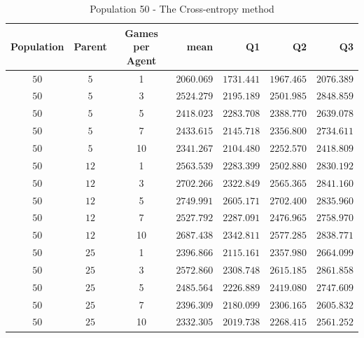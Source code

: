\begin{table}[H]
\centering
\small
\begin{tabular}{c c c r r r r}
Population & Parent & Games per Agent & mean & Q1 & Q2 & Q3\\
\hline
$50$ & $5$ & 1 & $2060.069$ & $1731.441$ & $1967.465$ & $2076.389$\\
\hdashline
$50$ & $5$ & 3 & $2524.279$ & $2195.189$ & $2501.985$ & $2848.859$\\
\hdashline
$50$ & $5$ & 5 & $2418.023$ & $2283.708$ & $2388.770$ & $2639.078$\\
$50$ & $5$ & 7 & $2433.615$ & $2145.718$ & $2356.800$ & $2734.611$\\
$50$ & $5$ & 10 & $2341.267$ & $2104.480$ & $2252.570$ & $2418.809$\\
$50$ & $12$ & 1 & $2563.539$ & $2283.399$ & $2502.880$ & $2830.192$\\
$50$ & $12$ & 3 & $2702.266$ & $2322.849$ & $2565.365$ & $2841.160$\\
\hdashline
$50$ & $12$ & 5 & $2749.991$ & $2605.171$ & $2702.400$ & $2835.960$\\
\hdashline
$50$ & $12$ & 7 & $2527.792$ & $2287.091$ & $2476.965$ & $2758.970$\\
$50$ & $12$ & 10 & $2687.438$ & $2342.811$ & $2577.285$ & $2838.771$\\
$50$ & $25$ & 1 & $2396.866$ & $2115.161$ & $2357.980$ & $2664.099$\\
\hdashline
$50$ & $25$ & 3 & $2572.860$ & $2308.748$ & $2615.185$ & $2861.858$\\
\hdashline
$50$ & $25$ & 5 & $2485.564$ & $2226.889$ & $2419.080$ & $2747.609$\\
$50$ & $25$ & 7 & $2396.309$ & $2180.099$ & $2306.165$ & $2605.832$\\
$50$ & $25$ & 10 & $2332.305$ & $2019.738$ & $2268.415$ & $2561.252$\\
\end{tabular}
\caption{Population 50 - The Cross-entropy method}
\end{table}



